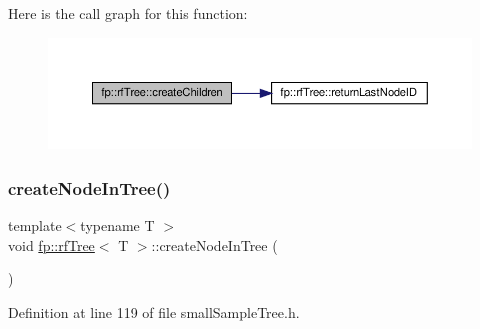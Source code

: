Here is the call graph for this function\+:
\nopagebreak
\begin{figure}[H]
\begin{center}
\leavevmode
\includegraphics[width=350pt]{classfp_1_1rfTree_ad226037e7f93c0fa2a1a960e19a87bed_cgraph}
\end{center}
\end{figure}
\mbox{\label{classfp_1_1rfTree_aaf9d8cdfbb1d10da53a375ea8204e393}} 
\subsubsection{\texorpdfstring{create\+Node\+In\+Tree()}{createNodeInTree()}\hspace{0.1cm}{\footnotesize\ttfamily [1/2]}}
{\footnotesize\ttfamily template$<$typename T $>$ \\
void \hyperlink{classfp_1_1rfTree}{fp\+::rf\+Tree}$<$ T $>$\+::create\+Node\+In\+Tree (\begin{DoxyParamCaption}{ }\end{DoxyParamCaption})\hspace{0.3cm}{\ttfamily [inline]}}



Definition at line 119 of file small\+Sample\+Tree.\+h.


